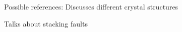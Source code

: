 Possible references:
Discusses different crystal structures

Talks about stacking faults

\nocite{*}